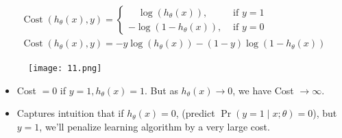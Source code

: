 \documentclass[12pt,a4paper,fleqn]{article}
\begin{document}
\begin{align*}
\begin{gathered}
\operatorname{Cost}\left(h_\theta(x), y\right)= \begin{cases} \quad \log \left(h_\theta(x)\right), & \text { if } y=1 \\
-\log \left(1-h_\theta(x)\right), & \text { if } y=0\end{cases} \\
\operatorname{Cost}\left(h_\theta(x), y\right)=-y \log \left(h_\theta(x)\right)-(1-y) \log \left(1-h_\theta(x)\right)
\end{gathered}
\end{align*}
\begin{figure}[H]
    \centering
    \texttt{[image: 11.png]}
\end{figure}
\begin{itemize}
    \item Cost \(=0\) if \(y=1, h_\theta(x)=1\). But as \(h_\theta(x) \rightarrow 0\), we have Cost \(\rightarrow \infty \).
    \item Captures intuition that if \(h_\theta(x)=0\), (predict \(\Pr(y=1 \mid x ; \theta)=0\)), but \(y=1\), we'll penalize learning algorithm by a very large cost.
\end{itemize}
\end{document}
